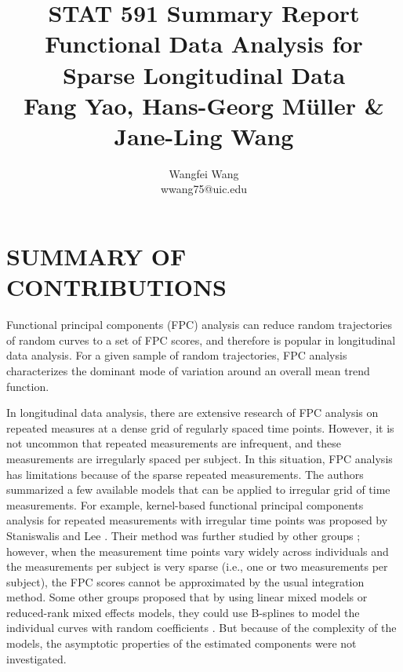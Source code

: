 \documentclass[11pt]{report}
\begin{document}
\title{
  \huge STAT 591 Summary Report \\ 
  \vspace{10mm}
  \large  Functional Data Analysis for Sparse Longitudinal Data\\
  \normalsize Fang Yao, Hans-Georg M\"{u}ller \& Jane-Ling Wang}

\author{Wangfei Wang \\ wwang75@uic.edu }

\graphicspath{{./Figures/}}

\maketitle



\section{SUMMARY OF CONTRIBUTIONS}
Functional principal components (FPC) analysis can reduce random trajectories of random curves to a set of FPC scores, and therefore is popular in longitudinal data analysis. 
For a given sample of random trajectories, FPC analysis characterizes the dominant mode of variation  around an overall mean trend function. 

In longitudinal data analysis, there are extensive research of FPC analysis on repeated measures at a dense grid of regularly spaced time points. 
However, it is not uncommon that repeated measurements are infrequent, and these measurements are irregularly spaced per subject. 
In this situation, FPC analysis has limitations because of the sparse repeated measurements. 
The authors summarized a few available models that can be applied to irregular grid of time measurements. 
For example, kernel-based functional principal components analysis for repeated measurements with irregular time points was proposed by Staniswalis and Lee \cite{Staniswalis1998}. 
Their method was further studied by other groups \cite{Besse1997, Boularan1994}; 
however, when the measurement time points vary widely across individuals and the measurements per subject is very sparse (i.e., one or two measurements per subject), the FPC scores cannot be approximated by the usual integration method. 
Some other groups proposed that by using linear mixed models or reduced-rank mixed effects models, they could use B-splines to model the individual curves with random coefficients \cite{Journal2019, Rice2001, Hastie2017, James2003}.
But because of the complexity of the models, the asymptotic properties of the estimated components were not investigated. 
\end{document}
